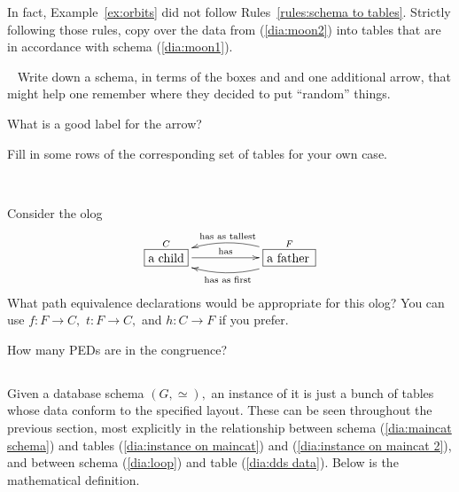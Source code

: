 \documentclass[../main/CT4S-EN-RU]{subfiles}
\begin{document}
\begin{exerciseENG}
In fact, Example~\ref{ex:orbits} did not follow Rules~\ref{rules:schema to tables}. Strictly following those rules, copy over the data from (\ref{dia:moon2}) into tables that are in accordance with schema (\ref{dia:moon1}).
\end{exerciseENG}

\begin{exerciseRUS}
\end{exerciseRUS}

\begin{exerciseENG}~
\sexc Write down a schema, in terms of the boxes  and  and one additional arrow, that might help one remember where they decided to put “random” things. 
\item What is a good label for the arrow? 
\item Fill in some rows of the corresponding set of tables for your own case.
\endsexc
\end{exerciseENG}

\begin{exerciseRUS}~
\end{exerciseRUS}

\begin{exerciseENG}\label{exc:father and child}
Consider the olog 
$$
\xymatrix{\obox{C}{.4in}{a child}\LA{rr}{has}&&\obox{F}{.5in}{a father}\ar@/^1pc/[ll]^{\tn{has as first}}\ar@/_1pc/[ll]_{\tn{has as tallest}}}
$$
\sexc What path equivalence declarations would be appropriate for this olog? You can use $f\colon F{→} C,$ $t\colon F{→} C,$ and $h\colon C{→} F$ if you prefer. 
\item How many PEDs are in the congruence?
\endsexc
\end{exerciseENG}

\begin{exerciseRUS}\label{exc:father and child}
\end{exerciseRUS}


\subsection{}

\begin{blockENG}
Given a database schema $(G,\simeq),$ an instance of it is just a bunch of tables whose data conform to the specified layout. These can be seen throughout the previous section, most explicitly in the relationship between schema (\ref{dia:maincat schema}) and tables (\ref{dia:instance on maincat}) and (\ref{dia:instance on maincat 2}), and between schema (\ref{dia:loop}) and table (\ref{dia:dds data}). Below is the mathematical definition.
\end{blockENG}
\end{document}

